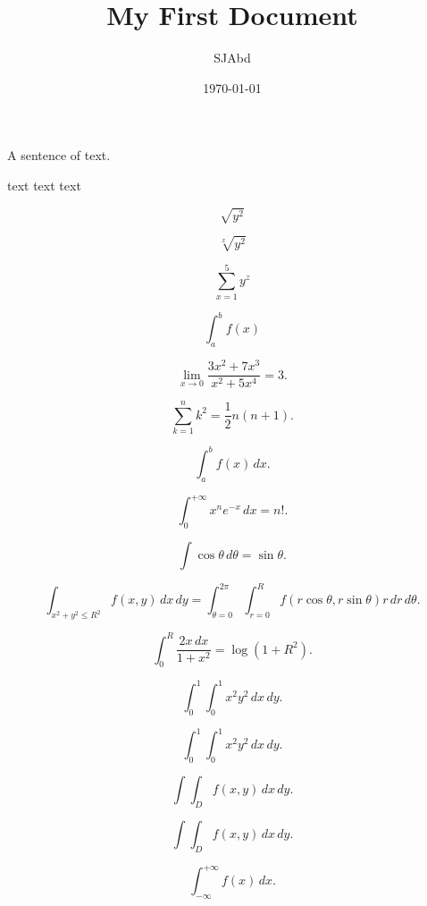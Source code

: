 \documentclass[a4paper,12pt]{article}
\begin{document}
\title{My First Document}
\author{SJAbd}
\date{\today}
\maketitle


A sentence of text.

{\color{red}text} 
{\color{blue}text} 
{\color{green}text} 

$$\sqrt{y^2}$$

$$\sqrt[x]{y^2}$$

$$\sum_{x=1}^5 y^z$$

$$\int_a^b f(x)$$


$$\lim_{x \to 0} \frac{3x^2 +7x^3}{x^2 +5x^4} = 3.$$


\[ \sum_{k=1}^n k^2 = \frac{1}{2} n (n+1).\]

\[ \int_a^b f(x)\,dx.\]

\[ \int_0^{+\infty} x^n e^{-x} \,dx = n!.\]

\[ \int \cos \theta \,d\theta = \sin \theta.\]


\[ \int_{x^2 + y^2 \leq R^2} f(x,y)\,dx\,dy
= \int_{\theta=0}^{2\pi} \int_{r=0}^R
f(r\cos\theta,r\sin\theta) r\,dr\,d\theta.\]



\[ \int_0^R \frac{2x\,dx}{1+x^2} = \log(1+R^2).\]


\[ \int_0^1 \! \int_0^1 x^2 y^2\,dx\,dy.\]


\[ \int_0^1 \int_0^1 x^2 y^2\,dx\,dy.\]


\[ \int \!\!\! \int_D f(x,y)\,dx\,dy.\]


\[ \int \int_D f(x,y)\,dx\,dy.\]


\[ \int_{-\infty}^{+\infty} f(x)\,dx.\]
\end{document}
